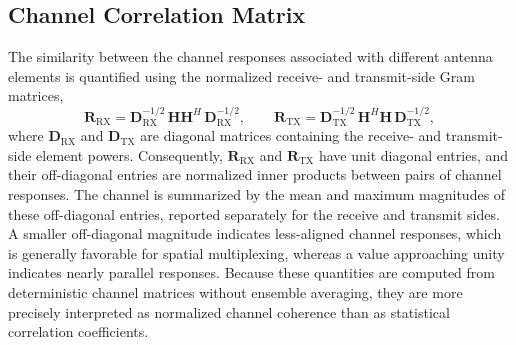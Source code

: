 \subsection{Channel Correlation Matrix}
The similarity between the channel responses associated with different antenna elements is quantified using the normalized receive- and transmit-side Gram matrices,
\begin{equation}
    \mathbf{R}_{\mathrm{RX}} = \mathbf{D}_{\mathrm{RX}}^{-1/2}\,\mathbf{H}\mathbf{H}^{H}\,\mathbf{D}_{\mathrm{RX}}^{-1/2},
    \qquad
    \mathbf{R}_{\mathrm{TX}} = \mathbf{D}_{\mathrm{TX}}^{-1/2}\,\mathbf{H}^{H}\mathbf{H}\,\mathbf{D}_{\mathrm{TX}}^{-1/2},
    \label{eq:mimo_correlation_matrix}
\end{equation}
where $\mathbf{D}_{\mathrm{RX}}$ and $\mathbf{D}_{\mathrm{TX}}$ are diagonal matrices containing the receive- and transmit-side element powers. Consequently, $\mathbf{R}_{\mathrm{RX}}$ and $\mathbf{R}_{\mathrm{TX}}$ have unit diagonal entries, and their off-diagonal entries are normalized inner products between pairs of channel responses. The channel is summarized by the mean and maximum magnitudes of these off-diagonal entries, reported separately for the receive and transmit sides. A smaller off-diagonal magnitude indicates less-aligned channel responses, which is generally favorable for spatial multiplexing, whereas a value approaching unity indicates nearly parallel responses. Because these quantities are computed from deterministic channel matrices without ensemble averaging, they are more precisely interpreted as normalized channel coherence than as statistical correlation coefficients.

